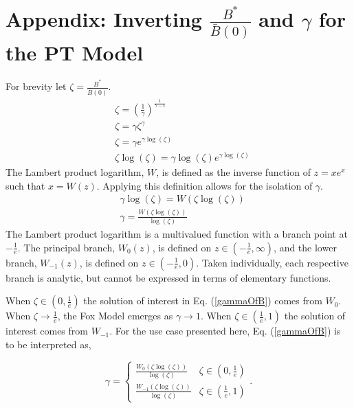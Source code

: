 \section{Appendix\label{lambApp}: Inverting $\frac{B^*}{\bar B(0)}$ and $\gamma$ for the PT Model}
For brevity let $\zeta=\frac{B^*}{\bar B(0)}$.
\begin{align*}
&\zeta=\left(\frac{1}{\gamma}\right)^{\frac{1}{\gamma-1}}\\
&\zeta=\gamma\zeta^{\gamma}\\
&\zeta=\gamma e^{\gamma\log(\zeta)}\\
&\zeta\log(\zeta)=\gamma\log(\zeta) e^{\gamma\log(\zeta)}
\end{align*}
The Lambert product logarithm, $W$, is defined as the inverse function of $z=xe^x$ such that $x=W(z)$. 
Applying this definition allows for the isolation of $\gamma$.
\begin{align}
&\gamma\log(\zeta)=W\left(\zeta\log(\zeta)\right) \nonumber\\
&\gamma=\frac{W\left(\zeta\log(\zeta)\right)}{\log(\zeta)} \label{gammaOfZeta}
\end{align}
The Lambert product logarithm is a multivalued function with a branch point at 
$-\frac{1}{e}$. The principal branch, $W_0(z)$, is defined on $z\in\left(-\frac{1}{e}, \infty\right)$, 
and the lower branch, $W_{-1}(z)$, is defined on $z\in\left(-\frac{1}{e}, 0\right)$. Taken 
individually, each respective branch is analytic, but cannot be expressed in terms 
of elementary functions.

%
When $\zeta\in\left(0, \frac{1}{e}\right)$ the solution of interest in Eq. (\ref{gammaOfB}) 
comes from $W_0$. %
When $\zeta\to\frac{1}{e}$, the Fox Model emerges as $\gamma\to1$.
When $\zeta\in\left(\frac{1}{e}, 1\right)$ the solution of interest comes from 
$W_{-1}$. For the use case presented here, Eq. (\ref{gammaOfB}) is to be interpreted as,

\begin{equation}
\gamma = 
\begin{cases} 
\frac{W_0\left(\zeta\log\left(\zeta\right)\right)}{\log\left(\zeta\right)} & \zeta\in\left(0, \frac{1}{e}\right)\\
\frac{W_{-1}\left(\zeta\log\left(\zeta\right)\right)}{\log\left(\zeta\right)} & \zeta\in\left(\frac{1}{e}, 1\right)
\end{cases}. 
\end{equation} 

